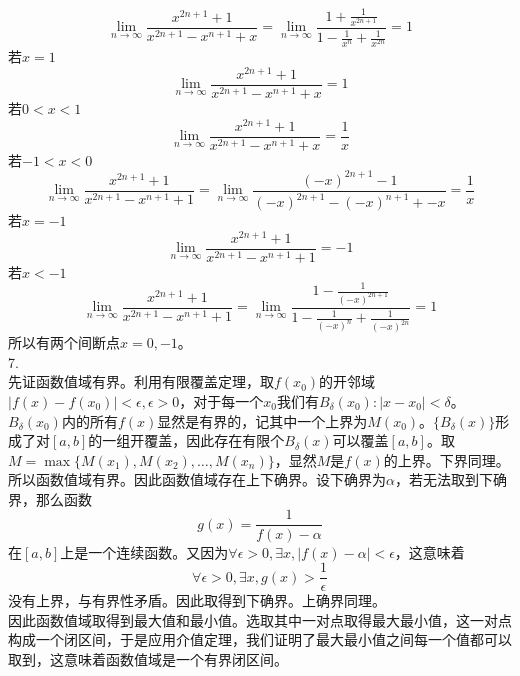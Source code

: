\documentclass[utf8]{ctexart}
\begin{document}
\[\lim\limits_{n\rightarrow\infty}\frac{x^{2n+1}+1}{x^{2n+1}-x^{n+1}+x}=\lim\limits_{n\rightarrow\infty}\frac{1+\frac{1}{x^{2n+1}}}{1-\frac{1}{x^n}+\frac{1}{x^{2n}}}=1\]
若$x=1$
\[\lim\limits_{n\rightarrow\infty}\frac{x^{2n+1}+1}{x^{2n+1}-x^{n+1}+x}=1\]
若$0<x<1$
\[\lim\limits_{n\rightarrow\infty}\frac{x^{2n+1}+1}{x^{2n+1}-x^{n+1}+x}=\frac{1}{x}\]
若$-1<x<0$
\[\lim\limits_{n\rightarrow\infty}\frac{x^{2n+1}+1}{x^{2n+1}-x^{n+1}+1}=\lim\limits_{n\rightarrow\infty}\frac{(-x)^{2n+1}-1}{(-x)^{2n+1}-(-x)^{n+1}+-x}=\frac{1}{x}\]
若$x=-1$
\[\lim\limits_{n\rightarrow\infty}\frac{x^{2n+1}+1}{x^{2n+1}-x^{n+1}+1}=-1\]
若$x<-1$
\[\lim\limits_{n\rightarrow\infty}\frac{x^{2n+1}+1}{x^{2n+1}-x^{n+1}+1}=\lim\limits_{n\rightarrow\infty}\frac{1-\frac{1}{(-x)^{2n+1}}}{1-\frac{1}{(-x)^n}+\frac{1}{(-x)^{2n}}}=1\]
所以有两个间断点$x=0,-1$。\\
7.\\
先证函数值域有界。利用有限覆盖定理，取$f(x_0)$的开邻域$|f(x)-f(x_0)|<\epsilon,\epsilon>0$，对于每一个$x_0$我们有$B_\delta(x_0):|x-x_0|<\delta$。$B_\delta(x_0)$内的所有$f(x)$显然是有界的，记其中一个上界为$M(x_0)$。$\{B_\delta(x)\}$形成了对$[a,b]$的一组开覆盖，因此存在有限个$B_\delta(x)$可以覆盖$[a,b]$。取$M=\max\{M(x_1),M(x_2),\dots,M(x_n)\}$，显然$M$是$f(x)$的上界。下界同理。\\
所以函数值域有界。因此函数值域存在上下确界。设下确界为$\alpha$，若无法取到下确界，那么函数
\[g(x)=\frac{1}{f(x)-\alpha}\]
在$[a,b]$上是一个连续函数。又因为$\forall\epsilon>0,\exists x,|f(x)-\alpha|<\epsilon$，这意味着
\[\forall\epsilon>0,\exists x,g(x)>\frac{1}{\epsilon}\]
没有上界，与有界性矛盾。因此取得到下确界。上确界同理。\\
因此函数值域取得到最大值和最小值。选取其中一对点取得最大最小值，这一对点构成一个闭区间，于是应用介值定理，我们证明了最大最小值之间每一个值都可以取到，这意味着函数值域是一个有界闭区间。
\end{document}
